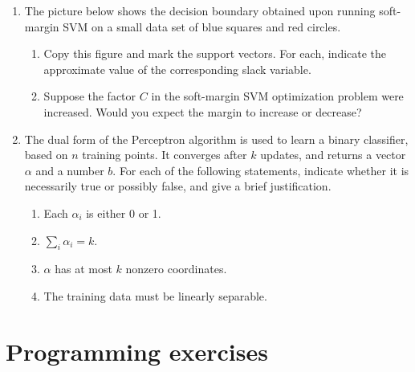 \documentclass{article}
\begin{document}
\begin{enumerate}
    \item The picture below shows the decision boundary obtained upon running soft-margin SVM on a small data set of blue squares and red circles.
    \begin{enumerate}
        \item Copy this figure and mark the support vectors. For each, indicate the approximate value of the corresponding slack variable.
        \item Suppose the factor $C$ in the soft-margin SVM optimization problem were increased. Would you expect the margin to increase or decrease?
    \end{enumerate}

    \item The dual form of the Perceptron algorithm is used to learn a binary classifier, based on $n$ training points. It converges after $k$ updates, and returns a vector $\alpha$ and a number $b$. For each of the following statements, indicate whether it is necessarily true or possibly false, and give a brief justification.
    \begin{enumerate}
        \item Each $\alpha_{i}$ is either 0 or 1.
        \item $\sum_{i} \alpha_{i}=k$.
        \item $\alpha$ has at most $k$ nonzero coordinates.
        \item The training data must be linearly separable.
    \end{enumerate}
\end{enumerate}

\section*{Programming exercises}
\end{document}
